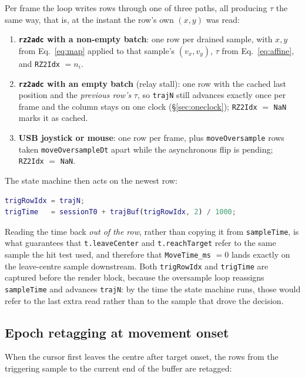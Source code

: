 \documentclass[11pt,a4paper]{article}
\newcommand{\code}[1]{\texttt{\small #1}}
\begin{document}
Per frame the loop writes rows through one of three paths, all producing $\tau$
the same way, that is, at the instant the row's own $(x,y)$ was read:

\begin{enumerate}[leftmargin=*,itemsep=2pt]
\item \textbf{\code{rz2adc} with a non-empty batch}: one row per drained sample,
with $x, y$ from Eq.~\eqref{eq:map} applied to that sample's $(v_x, v_y)$, $\tau$
from Eq.~\eqref{eq:affine}, and \code{RZ2Idx} $= n_i$.
\item \textbf{\code{rz2adc} with an empty batch} (relay stall): one row with the
cached last position and the \emph{previous row's} $\tau$, so \code{trajN} still
advances exactly once per frame and the column stays on one clock
(\S\ref{sec:oneclock}); \code{RZ2Idx} $=$ \code{NaN} marks it as cached.
\item \textbf{USB joystick or mouse}: one row per frame, plus
\code{moveOversample} rows taken \code{moveOversampleDt} apart while the
asynchronous flip is pending; \code{RZ2Idx} $=$ \code{NaN}.
\end{enumerate}

The state machine then acts on the newest row:

\begin{lstlisting}[language=Matlab]
trigRowIdx = trajN;
trigTime   = sessionT0 + trajBuf(trigRowIdx, 2) / 1000;
\end{lstlisting}

\noindent
Reading the time back \emph{out of the row}, rather than copying it from
\code{sampleTime}, is what guarantees that \code{t.leaveCenter} and
\code{t.reachTarget} refer to the same sample the hit test used, and therefore
that \code{MoveTime\_ms} $= 0$ lands exactly on the leave-centre sample
downstream. Both \code{trigRowIdx} and \code{trigTime} are captured before the
render block, because the oversample loop reassigns \code{sampleTime} and
advances \code{trajN}: by the time the state machine runs, those would refer to
the last extra read rather than to the sample that drove the decision.

\subsection{Epoch retagging at movement onset}

When the cursor first leaves the centre after target onset, the rows from the
triggering sample to the current end of the buffer are retagged:
\end{document}
